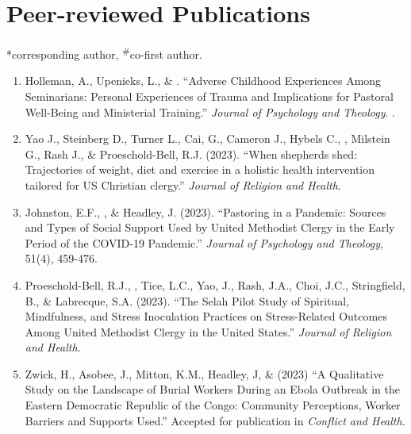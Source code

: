 \newcommand{\Revision}{\textit{under revision}}
\newcommand{\CS}{*} %
\newcommand{\CF}{\textsuperscript{\#}} %

\section*{Peer-reviewed Publications}
\CS corresponding author, \CF co-first author.

\begin{enumerate}

\item Holleman, A., Upenieks, L., \& \Eagle. ``Adverse Childhood Experiences Among Seminarians: Personal Experiences of Trauma and Implications for Pastoral Well-Being and Ministerial Training.'' \textit{Journal of Psychology and Theology}. .

\item Yao J., Steinberg D., Turner L., Cai, G., Cameron J., Hybels C., \Eagle, Milstein G., Rash J., \& Proeschold-Bell, R.J. (2023). ``When shepherds shed: Trajectories of weight, diet and exercise in a holistic health intervention tailored for US Christian clergy.'' \textit{Journal of Religion and Health}. 

\item Johnston, E.F., \Eagle, \& Headley, J. (2023). ``Pastoring in a Pandemic: Sources and Types of Social Support Used by United Methodist Clergy in the Early Period of the COVID-19 Pandemic.'' \textit{Journal of Psychology and Theology}, 51(4), 459-476. 
	
\item Proeschold-Bell, R.J., \Eagle, Tice, L.C., Yao, J., Rash, J.A., Choi, J.C., Stringfield, B., \& Labrecque, S.A. (2023). ``The Selah Pilot Study of Spiritual, Mindfulness, and Stress Inoculation Practices on Stress-Related Outcomes Among United Methodist Clergy in the United States.'' \textit{Journal of Religion and Health}. 
	
\item Zwick, H., Asobee, J., Mitton, K.M., Headley, J, \& \Eagle\CS \hspace{0.1em} (2023) ``A Qualitative Study on the Landscape of Burial Workers During an Ebola Outbreak in the Eastern Democratic Republic of the Congo: Community Perceptions, Worker Barriers and Supports Used.'' Accepted for publication in \textit{Conflict and Health}. 


\end{enumerate}
